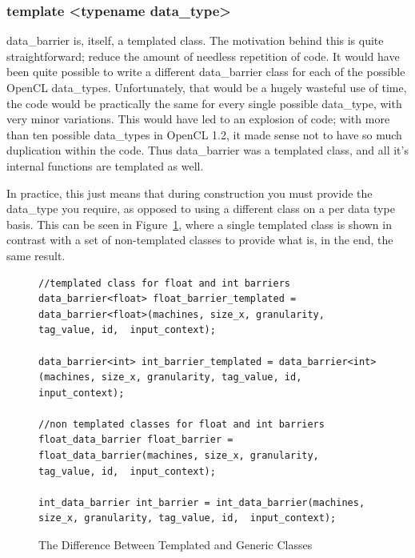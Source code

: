 \documentclass[../thesis.tex]{subfiles}
\begin{document}
  \subsubsection{template <typename data\_type>} %
  \label{ssub:template_typename_data_type}
    data\_barrier is, itself, a templated class. The motivation behind this is quite straightforward; reduce the amount of needless repetition of code. It would have been quite possible to write a different data\_barrier class for each of the possible OpenCL data\_types. Unfortunately, that would be a hugely wasteful use of time, the code would be practically the same for every single possible data\_type, with very minor variations. This would have led to an explosion of code; with more than ten possible data\_types \cite{opencldatatypes} in OpenCL 1.2, it made sense not to have so much duplication within the code. Thus data\_barrier was a templated class, and all it's internal functions are templated as well.

    In practice, this just means that during construction you must provide the data\_type you require, as opposed to using a different class on a per data type basis. This can be seen in Figure~\ref{fig:templated_vs_non_templated}, where a single templated class is shown in contrast with a set of non-templated classes to provide what is, in the end, the same result.

    \begin{figure}[htbp]
      \centering

      \lstset{language=cpp}  
      \begin{lstlisting}[tabsize=2]
//templated class for float and int barriers
data_barrier<float> float_barrier_templated = data_barrier<float>(machines, size_x, granularity, tag_value, id,  input_context);

data_barrier<int> int_barrier_templated = data_barrier<int>(machines, size_x, granularity, tag_value, id,  input_context);

//non templated classes for float and int barriers
float_data_barrier float_barrier = float_data_barrier(machines, size_x, granularity, tag_value, id,  input_context);

int_data_barrier int_barrier = int_data_barrier(machines, size_x, granularity, tag_value, id,  input_context);
        \end{lstlisting}

      \caption{The Difference Between Templated and Generic Classes}
      \label{fig:templated_vs_non_templated}
    \end{figure}
  
\end{document}
